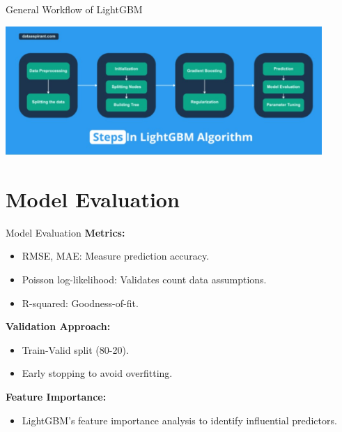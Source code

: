 \documentclass{beamer}\usepackage[]{graphicx}\usepackage[]{xcolor}
\begin{document}
\begin{frame}{General Workflow of LightGBM}
\begin{center}
    \includegraphics[width=0.9\textwidth]{Steps.jpg}
\end{center}
\end{frame}


\section{Model Evaluation}

\begin{frame}{Model Evaluation}
\textbf{Metrics:}
\begin{itemize}
    \item RMSE, MAE: Measure prediction accuracy.
    \item Poisson log-likelihood: Validates count data assumptions.
    \item R-squared: Goodness-of-fit.
\end{itemize}

\textbf{Validation Approach:}
\begin{itemize}
    \item Train-Valid split (80-20).
    \item Early stopping to avoid overfitting.
\end{itemize}

\textbf{Feature Importance:}
\begin{itemize}
    \item LightGBM's feature importance analysis to identify influential predictors.
\end{itemize}

\end{frame}
\end{document}
